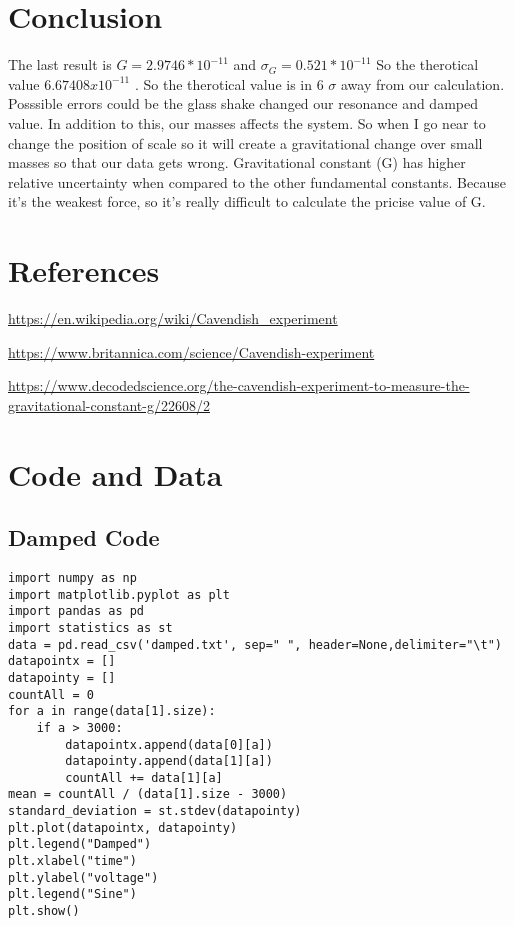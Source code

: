 \documentclass[12pt]{article}
\begin{document}
\section{Conclusion}
The last result is $G = 2.9746 * 10^{-11}$ and $\sigma_{G} = 0.521 * 10^{-11}$ So the therotical value $6.674 08 x 10^{-11}$ . So the therotical value is in 6 $\sigma$ away from our calculation. Posssible errors could be the glass shake changed our resonance and damped value. In addition to this, our masses affects the system. So when I go near to change the position of scale so it will create a gravitational change over small masses so that our data gets wrong.
Gravitational constant (G) has higher relative uncertainty when compared to the other fundamental
constants. Because it’s the weakest force, so it’s really difficult to calculate the pricise value of G.
\section{References}
\par
[1] \hyperref[Wikipedia]{https://en.wikipedia.org/wiki/Cavendish_experiment}
\par
[2] \hyperref[Britannica]{https://www.britannica.com/science/Cavendish-experiment}
\par
[3] \hyperref[Decoded Science]{https://www.decodedscience.org/the-cavendish-experiment-to-measure-the-gravitational-constant-g/22608/2}
\par
\section{Code and Data}
\subsection{Damped Code}
\begin{lstlisting}
import numpy as np
import matplotlib.pyplot as plt
import pandas as pd
import statistics as st
data = pd.read_csv('damped.txt', sep=" ", header=None,delimiter="\t")
datapointx = []
datapointy = []
countAll = 0
for a in range(data[1].size):
    if a > 3000:
        datapointx.append(data[0][a])
        datapointy.append(data[1][a])
        countAll += data[1][a]
mean = countAll / (data[1].size - 3000)
standard_deviation = st.stdev(datapointy)
plt.plot(datapointx, datapointy)
plt.legend("Damped")
plt.xlabel("time")
plt.ylabel("voltage")
plt.legend("Sine")
plt.show()
\end{lstlisting}
\end{document}
